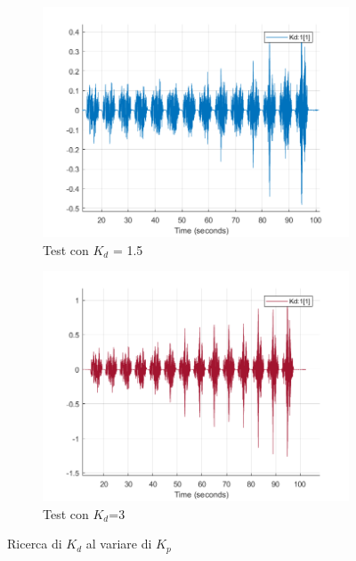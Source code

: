 \begin{figure}[!ht]
\begin{subfigure}{.5\textwidth}
  \centering
  \includegraphics[width=.85\linewidth]{Immagini/Sperimentale/Test_Kd=15.png}  
  \caption{Test con $K_d$ = 1.5}
  \label{fig:sub-kd1.5}
\end{subfigure}
\begin{subfigure}{.5\textwidth}
  \centering
  \includegraphics[width=.85\linewidth]{Immagini/Sperimentale/Test_Kd=3.png}  
  \caption{Test con $K_d$=3}
  \label{fig:sub-kd3}
\end{subfigure}
\caption{Ricerca di $K_d$ al variare di $K_p$}
\label{fig:KdTest}
\end{figure}
